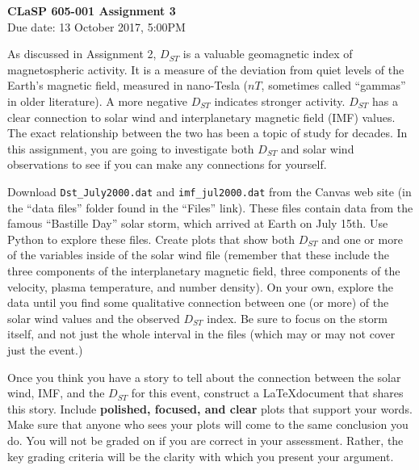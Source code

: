 \documentclass[12pt, letterpaper]{article}
\begin{document}
\begin{center}
  {\LARGE \textbf{CLaSP 605-001 Assignment 3}}\\
  {\large Due date: 13 October 2017, 5:00PM}\\
\end{center}

As discussed in Assignment 2, $D_{ST}$ is a valuable geomagnetic index of 
magnetospheric activity.  It is a measure of the deviation from quiet levels
of the Earth's magnetic field, measured in nano-Tesla ($nT$, sometimes called
``gammas'' in older literature).  A more negative $D_{ST}$ indicates stronger
activity.  $D_{ST}$ has a clear connection to solar wind
and interplanetary magnetic field (IMF) values.
The exact relationship between the two
has been a topic of study for decades.  In this assignment, you are going to
investigate both $D_{ST}$ and solar wind observations to see if you can make
any connections for yourself.

Download {\tt Dst\_July2000.dat} and {\tt imf\_jul2000.dat} from the Canvas
web site (in the ``data files'' folder found in the ``Files'' link).  These
files contain data from the famous ``Bastille Day'' solar storm, which arrived
at Earth on July 15th.  Use
Python to explore these files.  Create plots that show both $D_{ST}$ and one
or more of the variables inside of the solar wind file (remember that these
include the three components of the interplanetary magnetic field, three
components of the velocity, plasma temperature, and number density).
On your own,
explore the data until you find some qualitative connection between one (or
more) of the solar wind values and the observed $D_{ST}$ index.  Be sure to
focus on the storm itself, and not just the whole interval in the files (which
may or may not cover just the event.)

Once you think you have a story to tell about the connection between the
solar wind, IMF, and the $D_{ST}$ for this event, construct a \LaTeX document
that shares this story.  Include \textbf{polished, focused, and clear} plots
that support your words.  Make sure that anyone who sees your plots will
come to the same conclusion you do.  You will not be graded on if you are
correct in your assessment.  Rather, the key grading criteria will be the
clarity with which you present your argument.
\end{document}
